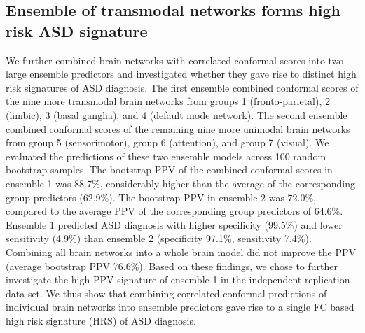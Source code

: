 \documentclass[9pt,lineno]{elife}
\begin{document}
\subsection{Ensemble of transmodal networks forms high risk ASD signature}
We further combined brain networks with correlated conformal scores into two large ensemble predictors and investigated whether they gave rise to distinct high risk signatures of ASD diagnosis. The first ensemble combined conformal scores of the nine more transmodal brain networks from groups 1 (fronto-parietal), 2 (limbic), 3 (basal ganglia), and 4 (default mode network). The second ensemble combined conformal scores of the remaining nine more unimodal brain networks from group 5 (sensorimotor), group 6 (attention), and group 7 (visual). We evaluated the predictions of these two ensemble models across 100 random bootstrap samples. The bootstrap PPV of the combined conformal scores in ensemble 1 was 88.7\%, considerably higher than the average of the corresponding group predictors (62.9\%). The bootstrap PPV in ensemble 2 was 72.0\%, compared to the average PPV of the corresponding group predictors of 64.6\%. Ensemble 1 predicted ASD diagnosis with higher specificity (99.5\%) and lower sensitivity (4.9\%) than ensemble 2 (specificity 97.1\%, sensitivity 7.4\%). Combining all brain networks into a whole brain model did not improve the PPV (average bootstrap PPV 76.6\%). Based on these findings, we chose to further investigate the high PPV signature of ensemble 1 in the independent replication data set. We thus show that combining correlated conformal predictions of individual brain networks into ensemble predictors gave rise to a single FC based high risk signature (HRS) of ASD diagnosis.
\end{document}

